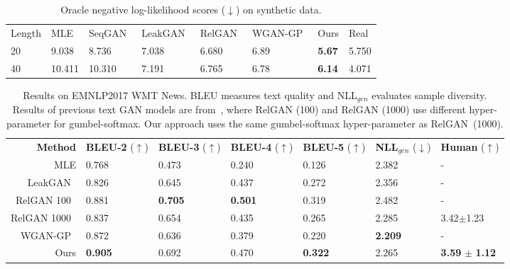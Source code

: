 \documentclass{article}
\newcommand{\0}{\bm{0}}
\begin{document}
\begin{table}[t]
\renewcommand{\arraystretch}{0.9} 
\centering
\small
\begin{tabular}{l | llllll | l}
\toprule
Length & MLE  & SeqGAN~\cite{yu2017seqgan} & LeakGAN~\cite{guo2018long} & RelGAN~\cite{nie2018relgan}  & WGAN-GP~\citep{wgangp} & Ours & Real  \\
\cmidrule{1-8}
20   & 9.038 & 8.736   & 7.038   & 6.680 & 6.89  & \textbf{5.67} & 5.750  \\
40   & 10.411 & 10.310  & 7.191   & 6.765 & 6.78 & \textbf{6.14} & 4.071\\
\bottomrule
\end{tabular}
\vspace{1pt}
\caption{Oracle negative log-likelihood scores ($\downarrow$) on synthetic data. 
} \label{tab:txtgan_oracle}
\vspace{-10pt}
\end{table}





\begin{table}[t]
\renewcommand{\arraystretch}{0.9} 
\setlength{\tabcolsep}{4.9pt} 
\small
\centering
\begin{tabular}{@{}r llll | l | l@{}}
\toprule
{\bf Method}        & {\bf BLEU-2} ($\uparrow$) & {\bf BLEU-3} ($\uparrow$) & {\bf BLEU-4} ($\uparrow$) & {\bf BLEU-5} ($\uparrow$) & {\bf NLL$_{gen}$} ($\downarrow$) & {\bf Human} ($\uparrow$)\\
\cmidrule{1-7}
MLE           & 0.768  & 0.473  & 0.240   & 0.126  & 2.382  & - \\
LeakGAN~\cite{guo2018long}       & 0.826  & 0.645  & 0.437  & 0.272  & 2.356  & - \\
RelGAN 100~\cite{nie2018relgan}  & 0.881  & \textbf{0.705}  & \textbf{0.501}  & 0.319  & 2.482  & - \\
RelGAN 1000~\cite{nie2018relgan} & 0.837  & 0.654  & 0.435  & 0.265  & 2.285  & 3.42$\pm$1.23 \\
WGAN-GP~\cite{wgangp}       & 0.872  & 0.636  & 0.379  & 0.220   & \textbf{2.209}  & - \\\cmidrule{1-7}
Ours          & \textbf{0.905}  & 0.692  & 0.470   & \textbf{0.322}  & 2.265 & {\bf 3.59} $\pm$ {\bf 1.12} \\
\bottomrule
\end{tabular}
\vspace{1pt}
\caption{
Results on EMNLP2017 WMT News. BLEU measures text quality and NLL$_{gen}$ evaluates sample diversity. Results of previous text GAN models are from~\cite{nie2018relgan}, where RelGAN (100) and RelGAN (1000) use different hyper-parameter for gumbel-softmax. Our approach uses the same gumbel-softmax hyper-parameter as RelGAN~(1000). 
}
\label{tab:text-emnlp}
\vspace{-10pt}
\end{table}
\end{document}
